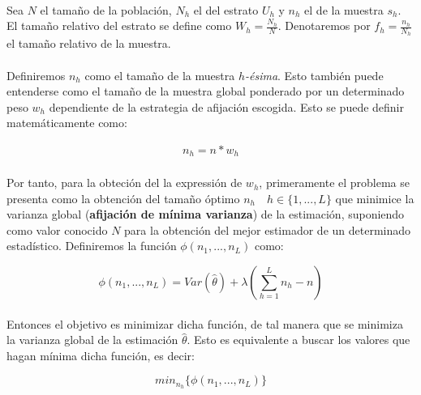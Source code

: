 \documentclass{article}
\begin{document}
    \paragraph{}
    Sea $N$ el tamaño de la población, $N_h$ el del estrato $U_h$ y $n_h$ el de la muestra $s_h$. El tamaño relativo del estrato se define como $W_h = \frac{N_h}{N}$. Denotaremos por $f_h = \frac{n_h}{N_h}$ el tamaño relativo de la muestra.

    \paragraph{}
    Definiremos $n_h$ como el tamaño de la muestra \emph{$h$-ésima}. Esto también puede entenderse como el tamaño de la muestra global ponderado por un determinado peso $w_h$  dependiente de la estrategia de afijación escogida. Esto se puede definir matemáticamente como:

    \begin{align}
      n_h = n * w_h
    \end{align}

    \paragraph{}
    Por tanto, para la obteción del la expressión de $w_h$, primeramente el problema se presenta como la obtención del tamaño óptimo $n_h \quad h \in \{1,..., L\}$ que minimice la varianza global (\textbf{afijación de mínima varianza}) de la estimación, suponiendo como valor conocido $N$ para la obtención del mejor estimador de un determinado estadístico. Definiremos la función $\phi(n_1, ..., n_L)$ como:

    \begin{equation}
      \phi(n_1, ..., n_L) = Var(\widehat{\theta}) + \lambda \left( \sum\limits_{h=1}^L n_h - n\right)
    \end{equation}

    \paragraph{}
    Entonces el objetivo es minimizar dicha función, de tal manera que se minimiza la varianza global de la estimación $\widehat{\theta}$. Esto es equivalente a buscar los valores que hagan mínima dicha función, es decir:

    \begin{equation}
      min_{n_h}\{\phi(n_1, ..., n_L)\}
    \end{equation}
\end{document}
